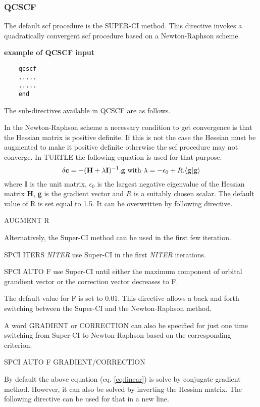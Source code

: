 \documentclass[11pt,fleqn]{article}
\begin{document}
\subsubsection{QCSCF}

The default scf procedure is the SUPER-CI method.
This directive invokes a quadratically convergent scf
procedure based on a Newton-Raphson scheme.

{\bf example of QCSCF input}
\begin{verbatim} 
    qcscf
    .....
    .....
    end 
\end{verbatim}

The sub-directives available in QCSCF are as follows.

In the Newton-Raphson scheme a necessary condition to get convergence
is that the Hessian matrix is positive definite. If this is not the case the 
Hessian must be augmented to make it positive definite otherwise the scf 
procedure may not converge. In TURTLE the following equation is used 
for that purpose.
\begin{equation}
\label{eq:linear}
        \delta{\bf c} = -( {\bf H} + \lambda{\bf I})^{-1} . {\bf g}
         \mbox{ with }  \lambda = - \epsilon_0 + R . \langle {\bf g} | {\bf
g} \rangle
\end{equation}
where {\bf I} is the unit matrix, $\epsilon_0$ is the largest negative
eigenvalue 
of the Hessian matrix {\bf H}, {\bf g} is the gradient vector and $R$ is a
suitably 
chosen scalar. The default value of R is set equal to 1.5. It can be overwritten 
by following directive.

AUGMENT R

Alternatively, the Super-CI method can be used in the first few iteration.

SPCI ITERS {\em NITER} use Super-CI in the first {\em NITER} iterations.

SPCI AUTO F use Super-CI until either the maximum component of orbital
grandient vector or the correction vector decreases to F.

The default value for F is set to 0.01. This directive allows a back and
forth switching between the Super-CI and the Newton-Raphson method.

A word GRADIENT or CORRECTION can also be specified for just one time
switching from Super-CI to Newton-Raphson based on the corresponding 
criterion.

SPCI AUTO F GRADIENT/CORRECTION

By default the above equation (eq. \ref{eq:linear}) is solve by conjugate
gradient method. However,
it can also be solved by inverting the Hessian matrix. The following directive
can be used for that in a new line.
\end{document}
